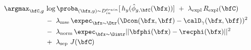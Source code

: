 \begin{align}
\label{equ: concept learning}
\argmax_{\bfC, g}\, &\log \proba_{(\bfx, y) \sim D^{train}_{in}}[\, h_{y}(\hat{\phi}_{g, \bfC}(\bfx))] ~+~ \lambda_{\textrm{expl}}\, R_{\textrm{expl}}(\bfC) \nonumber \\
&-~ \lambda_{\textrm{mse}}\, \expec_{\bfx \sim \Dtr} (\Dcon(\bfx, \bff) - \calD_\gamma(\bfx, \bff))^2 \nonumber \\
&-~ \lambda_{\textrm{norm}}\, \expec_{\bfx \sim \Dintr}||\bfphi(\bfx) - \recphi(\bfx)||^2 \nonumber \\
&+~ \lambda_{\textrm{sep}}~J(\bfC)
\end{align}
%

